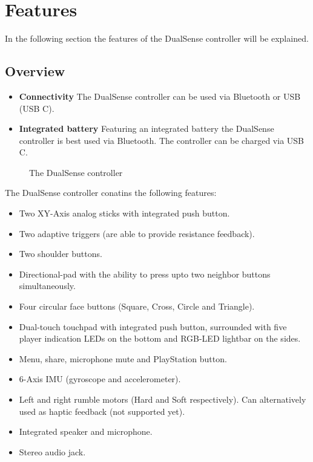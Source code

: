\section{Features}
In the following section the features of the DualSense controller will be explained.

\subsection{Overview}
\begin{itemize}
	\item \textbf{Connectivity} The DualSense controller can be used via Bluetooth or USB (USB C).
	\item \textbf{Integrated battery} Featuring an integrated battery the DualSense controller is best used via Bluetooth. The controller can be charged via USB C.
\end{itemize}

\begin{figure}[H]
    \centering
    \qquad
    \caption{The DualSense controller}
\end{figure}

The DualSense controller conatins the following features:
\begin{itemize}
	\item Two XY-Axis analog sticks with integrated push button.
	\item Two adaptive triggers (are able to provide resistance feedback).
	\item Two shoulder buttons.
	\item Directional-pad with the ability to press upto two neighbor buttons simultaneously.
	\item Four circular face buttons (Square, Cross, Circle and Triangle).
	\item Dual-touch touchpad with integrated push button, surrounded with five player indication LEDs on the bottom and RGB-LED lightbar on the sides.
	\item Menu, share, microphone mute and PlayStation button.
	\item 6-Axis IMU (gyroscope and  accelerometer).
	\item Left and right rumble motors (Hard and Soft respectively). Can alternatively used as haptic feedback (not supported yet).
	\item Integrated speaker and microphone.
	\item Stereo audio jack.	
\end{itemize}

